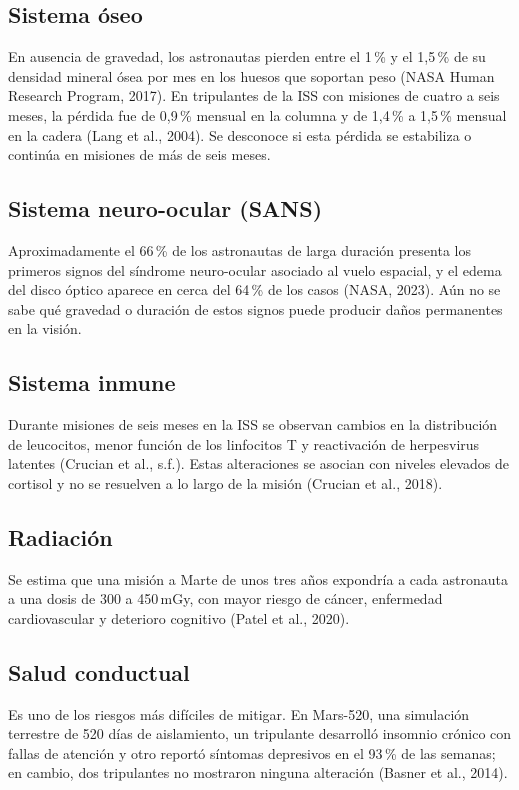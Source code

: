 \documentclass[11pt,a4paper]{article}
\begin{document}
\subsection{Sistema óseo}
En ausencia de gravedad, los astronautas pierden entre el 1\,\% y el 1,5\,\% de su densidad mineral ósea por mes en los huesos que soportan peso (NASA Human Research Program, 2017). En tripulantes de la ISS con misiones de cuatro a seis meses, la pérdida fue de 0,9\,\% mensual en la columna y de 1,4\,\% a 1,5\,\% mensual en la cadera (Lang et al., 2004). Se desconoce si esta pérdida se estabiliza o continúa en misiones de más de seis meses.

\subsection{Sistema neuro-ocular (SANS)}
Aproximadamente el 66\,\% de los astronautas de larga duración presenta los primeros signos del síndrome neuro-ocular asociado al vuelo espacial, y el edema del disco óptico aparece en cerca del 64\,\% de los casos (NASA, 2023). Aún no se sabe qué gravedad o duración de estos signos puede producir daños permanentes en la visión.

\subsection{Sistema inmune}
Durante misiones de seis meses en la ISS se observan cambios en la distribución de leucocitos, menor función de los linfocitos T y reactivación de herpesvirus latentes (Crucian et al., s.f.). Estas alteraciones se asocian con niveles elevados de cortisol y no se resuelven a lo largo de la misión (Crucian et al., 2018).

\subsection{Radiación}
Se estima que una misión a Marte de unos tres años expondría a cada astronauta a una dosis de 300 a 450\,mGy, con mayor riesgo de cáncer, enfermedad cardiovascular y deterioro cognitivo (Patel et al., 2020).

\subsection{Salud conductual}
Es uno de los riesgos más difíciles de mitigar. En Mars-520, una simulación terrestre de 520 días de aislamiento, un tripulante desarrolló insomnio crónico con fallas de atención y otro reportó síntomas depresivos en el 93\,\% de las semanas; en cambio, dos tripulantes no mostraron ninguna alteración (Basner et al., 2014).
\end{document}
